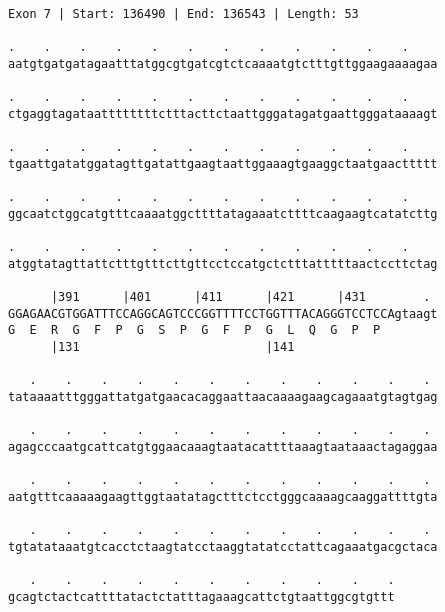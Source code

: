 \documentclass{article}
\begin{document}
\newpage
\begin{Verbatim}
Exon 7 | Start: 136490 | End: 136543 | Length: 53
 
.    .    .    .    .    .    .    .    .    .    .    .    
aatgtgatgatagaatttatggcgtgatcgtctcaaaatgtctttgttggaagaaaagaa
  
.    .    .    .    .    .    .    .    .    .    .    .    
ctgaggtagataattttttttctttacttctaattgggatagatgaattgggataaaagt
  
.    .    .    .    .    .    .    .    .    .    .    .    
tgaattgatatggatagttgatattgaagtaattggaaagtgaaggctaatgaacttttt
  
.    .    .    .    .    .    .    .    .    .    .    .    
ggcaatctggcatgtttcaaaatggcttttatagaaatcttttcaagaagtcatatcttg
  
.    .    .    .    .    .    .    .    .    .    .    .    
atggtatagttattctttgtttcttgttcctccatgctctttatttttaactccttctag
  
      |391      |401      |411      |421      |431        . 
GGAGAACGTGGATTTCCAGGCAGTCCCGGTTTTCCTGGTTTACAGGGTCCTCCAgtaagt
G  E  R  G  F  P  G  S  P  G  F  P  G  L  Q  G  P  P        
      |131                          |141                    
  
   .    .    .    .    .    .    .    .    .    .    .    . 
tataaaatttgggattatgatgaacacaggaattaacaaaagaagcagaaatgtagtgag
  
   .    .    .    .    .    .    .    .    .    .    .    . 
agagcccaatgcattcatgtggaacaaagtaatacattttaaagtaataaactagaggaa
  
   .    .    .    .    .    .    .    .    .    .    .    . 
aatgtttcaaaaagaagttggtaatatagctttctcctgggcaaaagcaaggattttgta
  
   .    .    .    .    .    .    .    .    .    .    .    . 
tgtatataaatgtcacctctaagtatcctaaggtatatcctattcagaaatgacgctaca
  
   .    .    .    .    .    .    .    .    .    .    .
gcagtctactcattttatactctatttagaaagcattctgtaattggcgtgttt
\end{Verbatim}
\newpage
\end{document}
